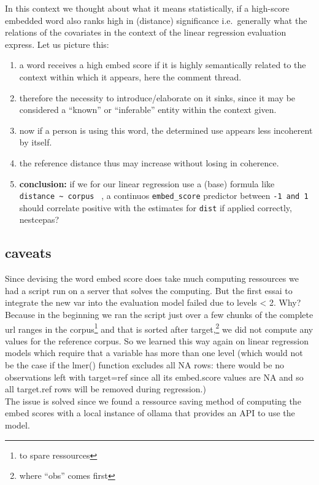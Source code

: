 \documentclass[
  12pt,
  oneside]{book}
\providecommand{\tightlist}{%
  \setlength{\itemsep}{0pt}\setlength{\parskip}{0pt}}
\begin{document}
In this context we thought about what it means statistically, if a high-score embedded word also ranks high in (distance) significance i.e.~generally what the relations of the covariates in the context of the linear regression evaluation express. Let us picture this:

\begin{enumerate}
\def\labelenumi{\arabic{enumi}.}
\tightlist
\item
  a word receives a high embed score if it is highly semantically related to the context within which it appears, here the comment thread.
\item
  therefore the necessity to introduce/elaborate on it sinks, since it may be considered a ``known'' or ``inferable'' entity within the context given.
\item
  now if a person is using this word, the determined use appears less incoherent by itself.
\item
  the reference distance thus may increase without losing in coherence.
\item
  \textbf{conclusion:} if we for our linear regression use a (base) formula like \texttt{distance\ \textasciitilde{}\ corpus~} , a continuos \texttt{embed\_score} predictor between \texttt{-1\ and\ 1} should correlate positive with the estimates for \texttt{dist} if applied correctly, nestcepas?
\end{enumerate}

\subsection{caveats}\label{caveats}

Since devising the word embed score does take much computing ressources we had a script run on a server that solves the computing. But the first essai to integrate the new var into the evaluation model failed due to levels \textless{} 2. Why? Because in the beginning we ran the script just over a few chunks of the complete url ranges in the corpus\footnote{to spare ressources} and that is sorted after target,\footnote{where ``obs'' comes first} we did not compute any values for the reference corpus. So we learned this way again on linear regression models which require that a variable has more than one level (which would not be the case if the lmer() function excludes all NA rows: there would be no observations left with target=ref since all its embed.score values are NA and so all target.ref rows will be removed during regression.)\\
The issue is solved since we found a ressource saving method of computing the embed scores with a local instance of ollama that provides an API to use the model.
\end{document}
